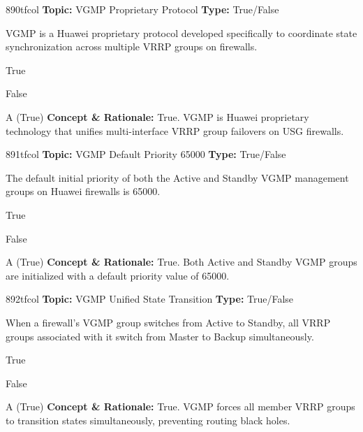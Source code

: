 \begin{qcard}{890}{tfcol}
\textcolor{darkslate!75}{\small\textbf{Topic:} VGMP Proprietary Protocol \hfill \textbf{Type:} True/False}\vspace{0.4em}\par
VGMP is a Huawei proprietary protocol developed specifically to coordinate state synchronization across multiple VRRP groups on firewalls.
\begin{qoptions}
\item True
\item False
\end{qoptions}
\end{qcard}
\nopagebreak
\begin{explainbox}{A (True)}
\textbf{Concept \& Rationale:} True. VGMP is Huawei proprietary technology that unifies multi-interface VRRP group failovers on USG firewalls.
\end{explainbox}

\begin{qcard}{891}{tfcol}
\textcolor{darkslate!75}{\small\textbf{Topic:} VGMP Default Priority 65000 \hfill \textbf{Type:} True/False}\vspace{0.4em}\par
The default initial priority of both the Active and Standby VGMP management groups on Huawei firewalls is 65000.
\begin{qoptions}
\item True
\item False
\end{qoptions}
\end{qcard}
\nopagebreak
\begin{explainbox}{A (True)}
\textbf{Concept \& Rationale:} True. Both Active and Standby VGMP groups are initialized with a default priority value of 65000.
\end{explainbox}

\begin{qcard}{892}{tfcol}
\textcolor{darkslate!75}{\small\textbf{Topic:} VGMP Unified State Transition \hfill \textbf{Type:} True/False}\vspace{0.4em}\par
When a firewall's VGMP group switches from Active to Standby, all VRRP groups associated with it switch from Master to Backup simultaneously.
\begin{qoptions}
\item True
\item False
\end{qoptions}
\end{qcard}
\nopagebreak
\begin{explainbox}{A (True)}
\textbf{Concept \& Rationale:} True. VGMP forces all member VRRP groups to transition states simultaneously, preventing routing black holes.
\end{explainbox}

